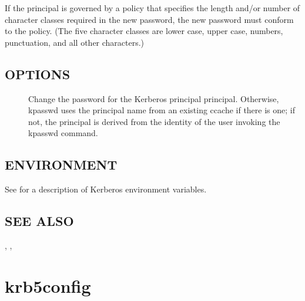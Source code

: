 \documentclass[letterpaper,10pt,english]{sphinxmanual}
\begin{document}
\sphinxAtStartPar
If the principal is governed by a policy that specifies the length
and/or number of character classes required in the new password, the
new password must conform to the policy.  (The five character classes
are lower case, upper case, numbers, punctuation, and all other
characters.)


\subsection{OPTIONS}
\label{\detokenize{user/user_commands/kpasswd:options}}\begin{description}
\item[{}] \leavevmode
\sphinxAtStartPar
Change the password for the Kerberos principal principal.
Otherwise, kpasswd uses the principal name from an existing ccache
if there is one; if not, the principal is derived from the
identity of the user invoking the kpasswd command.

\end{description}


\subsection{ENVIRONMENT}
\label{\detokenize{user/user_commands/kpasswd:environment}}
\sphinxAtStartPar
See {\hyperref[\detokenize{user/user_config/kerberos:kerberos-7}]{}} for a description of Kerberos environment
variables.


\subsection{SEE ALSO}
\label{\detokenize{user/user_commands/kpasswd:see-also}}
\sphinxAtStartPar
{}, , {\hyperref[\detokenize{user/user_config/kerberos:kerberos-7}]{}}


\section{krb5\sphinxhyphen{}config}
\label{\detokenize{user/user_commands/krb5-config:krb5-config}}\label{\detokenize{user/user_commands/krb5-config:krb5-config-1}}\label{\detokenize{user/user_commands/krb5-config::doc}}
\end{document}
